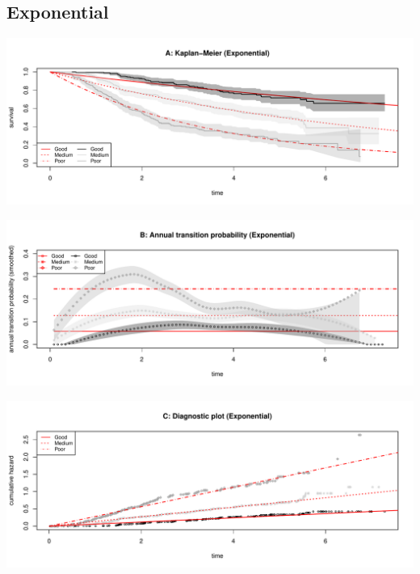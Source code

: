 \documentclass[
]{article}
\begin{document}
\clearpage

\hypertarget{exponential}{%
\subsection{Exponential}\label{exponential}}

\begin{flushleft}\includegraphics[height=0.25\textheight]{Images/expo-1} \end{flushleft}

\begin{flushleft}\includegraphics[height=0.25\textheight]{Images/expo-2} \end{flushleft}

\begin{flushleft}\includegraphics[height=0.25\textheight]{Images/expo-3} \end{flushleft}

\clearpage
\end{document}
